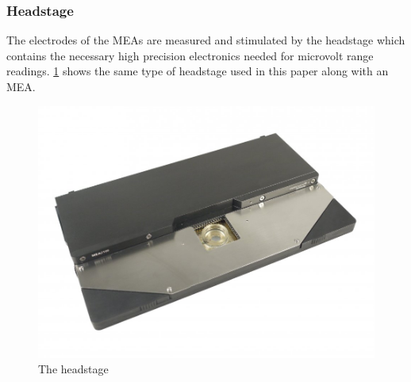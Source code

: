 \subsubsection{Headstage}
The electrodes of the MEAs are measured and stimulated by the headstage which
contains the necessary high precision electronics needed for microvolt range readings.
\ref{fig:headstage} shows the same type of headstage used in this paper along
with an MEA.
\begin{figure}[h!]
    \includegraphics[width=\linewidth]{images/MEA2100-HS60.jpg}
    \caption{The headstage}
    \label{fig:headstage}
\end{figure}

